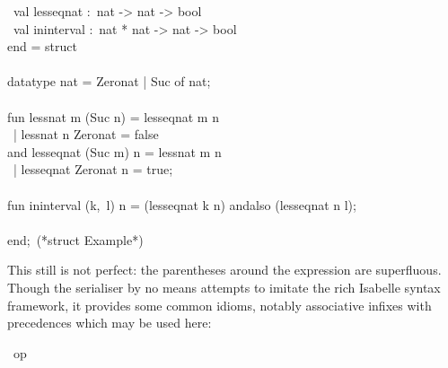 \begin{isabellebody}
\begin{isamarkuptext}
\hspace*{0pt} ~val less{}eq{}nat :~nat -> nat -> bool\\
\hspace*{0pt} ~val in{}interval :~nat * nat -> nat -> bool\\
\hspace*{0pt}end = struct\\
\hspace*{0pt}\\
\hspace*{0pt}datatype nat = Zero{}nat | Suc of nat;\\
\hspace*{0pt}\\
\hspace*{0pt}fun less{}nat m (Suc n) = less{}eq{}nat m n\\
\hspace*{0pt} ~| less{}nat n Zero{}nat = false\\
\hspace*{0pt}and less{}eq{}nat (Suc m) n = less{}nat m n\\
\hspace*{0pt} ~| less{}eq{}nat Zero{}nat n = true;\\
\hspace*{0pt}\\
\hspace*{0pt}fun in{}interval (k,~l) n = (less{}eq{}nat k n) andalso (less{}eq{}nat n l);\\
\hspace*{0pt}\\
\hspace*{0pt}end;~(*struct Example*)%
\end{isamarkuptext}%
\isamarkuptrue%
%
\endisatagquote
{\isafoldquote}%
%
\isadelimquote
%
\endisadelimquote
%
\begin{isamarkuptext}%
\noindent This still is not perfect: the parentheses around the
   expression are superfluous.  Though the serialiser by
  no means attempts to imitate the rich Isabelle syntax framework, it
  provides some common idioms, notably associative infixes with
  precedences which may be used here:%
\end{isamarkuptext}%
\isamarkuptrue%
%
\isadelimquotett
%
\endisadelimquotett
%
\isatagquotett
{}\isamarkupfalse%
\ {\isachardoublequoteopen}op\ {\isasymand}{\isachardoublequoteclose}\isanewline

\end{isabellebody}
